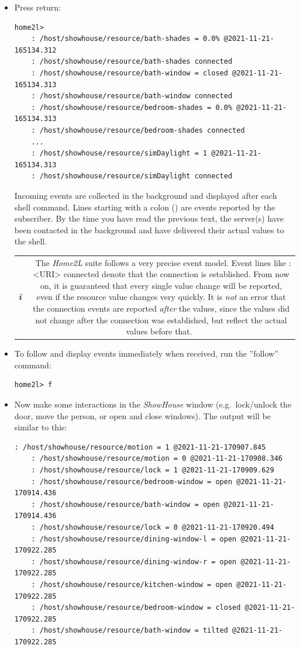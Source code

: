 \documentclass[12pt,english,parskip=half,headheight=19pt]{scrreprt}
\newcommand{\lst}[1]{\colorbox{lstbackground}{\footnotesize\code{#1}}}
\newcommand{\lstf}[1]{\colorbox{lstbackground}{\ttfamily\footnotesize#1}}
\newcommand{\infobox}[1]{
  \par
  \medskip
  \hfill
  \setlength\arrayrulewidth{1pt}
  \begin{tabular}[t]{c|c|}
    \parbox{1.8em}{\hfill\textit{\Huge\textbf{i}\,}}
    &
    \,\parbox{0.89\linewidth}{\setlength{\parskip}{0.5em} \small #1}\,
  \end{tabular}
  \medskip
  \par
}
\begin{document}
\begin{itemize}[$\blacktriangleright$]
\item
  Press return:
  \begin{lstlisting}[language=home2l]
    home2l>
    : /host/showhouse/resource/bath-shades = 0.0% @2021-11-21-165134.312
    : /host/showhouse/resource/bath-shades connected
    : /host/showhouse/resource/bath-window = closed @2021-11-21-165134.313
    : /host/showhouse/resource/bath-window connected
    : /host/showhouse/resource/bedroom-shades = 0.0% @2021-11-21-165134.313
    : /host/showhouse/resource/bedroom-shades connected
    ...
    : /host/showhouse/resource/simDaylight = 1 @2021-11-21-165134.313
    : /host/showhouse/resource/simDaylight connected
  \end{lstlisting}
  Incoming events are collected in the background and displayed after each shell command.
  Lines starting with a colon (\lst{:}) are events reported by the subscriber.
  By the time you have read the previous text, the server(s) have been contacted in the background
  and have delivered their actual values to the shell.

  \infobox{
    The \textit{Home2L} suite follows a very precise event model.
    Event lines like \lstf{: <URI> connected} denote that the connection is established.
    From now on, it is guaranteed that every single value change will be reported,
    even if the resource value changes very quickly.
    It is \textit{not} an error that the connection events are reported \textit{after} the
    values, since the values did not change after the connection was established, but reflect
    the actual values before that.
  }

\item
  To follow and display events immediately when received, run the ''follow'' command:
  \begin{lstlisting}[language=home2l]
    home2l> f
  \end{lstlisting}

\item
  Now make some interactions in the \textit{ShowHouse} window
  (e.g.~lock/unlock the door, move the person, or open and close windows).
  The output will be similar to this:
  \begin{lstlisting}[language=home2l]
    : /host/showhouse/resource/motion = 1 @2021-11-21-170907.845
    : /host/showhouse/resource/motion = 0 @2021-11-21-170908.346
    : /host/showhouse/resource/lock = 1 @2021-11-21-170909.629
    : /host/showhouse/resource/bedroom-window = open @2021-11-21-170914.436
    : /host/showhouse/resource/bath-window = open @2021-11-21-170914.436
    : /host/showhouse/resource/lock = 0 @2021-11-21-170920.494
    : /host/showhouse/resource/dining-window-l = open @2021-11-21-170922.285
    : /host/showhouse/resource/dining-window-r = open @2021-11-21-170922.285
    : /host/showhouse/resource/kitchen-window = open @2021-11-21-170922.285
    : /host/showhouse/resource/bedroom-window = closed @2021-11-21-170922.285
    : /host/showhouse/resource/bath-window = tilted @2021-11-21-170922.285
  \end{lstlisting}


\end{itemize}
\end{document}
